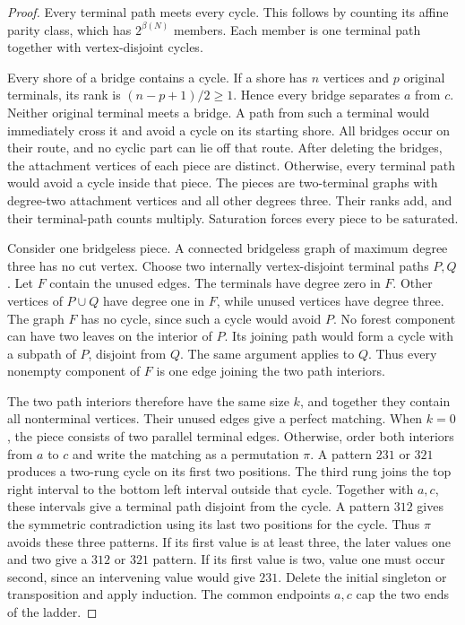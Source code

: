 \begin{proof}
Every terminal path meets every cycle.
This follows by counting its affine parity class, which has $2^{\beta(N)}$ members.
Each member is one terminal path together with vertex-disjoint cycles.

Every shore of a bridge contains a cycle.
If a shore has $n$ vertices and $p$ original terminals, its rank is $(n-p+1)/2\ge1$.
Hence every bridge separates $a$ from $c$.
Neither original terminal meets a bridge.
A path from such a terminal would immediately cross it and avoid a cycle on its starting shore.
All bridges occur on their route, and no cyclic part can lie off that route.
After deleting the bridges, the attachment vertices of each piece are distinct.
Otherwise, every terminal path would avoid a cycle inside that piece.
The pieces are two-terminal graphs with degree-two attachment vertices and all other degrees three.
Their ranks add, and their terminal-path counts multiply.
Saturation forces every piece to be saturated.

Consider one bridgeless piece.
A connected bridgeless graph of maximum degree three has no cut vertex.
Choose two internally vertex-disjoint terminal paths $P,Q$.
Let $F$ contain the unused edges.
The terminals have degree zero in $F$.
Other vertices of $P\cup Q$ have degree one in $F$, while unused vertices have degree three.
The graph $F$ has no cycle, since such a cycle would avoid $P$.
No forest component can have two leaves on the interior of $P$.
Its joining path would form a cycle with a subpath of $P$, disjoint from $Q$.
The same argument applies to $Q$.
Thus every nonempty component of $F$ is one edge joining the two path interiors.

The two path interiors therefore have the same size $k$, and together they contain all nonterminal vertices.
Their unused edges give a perfect matching.
When $k=0$, the piece consists of two parallel terminal edges.
Otherwise, order both interiors from $a$ to $c$ and write the matching as a permutation $\pi$.
A pattern $231$ or $321$ produces a two-rung cycle on its first two positions.
The third rung joins the top right interval to the bottom left interval outside that cycle.
Together with $a,c$, these intervals give a terminal path disjoint from the cycle.
A pattern $312$ gives the symmetric contradiction using its last two positions for the cycle.
Thus $\pi$ avoids these three patterns.
If its first value is at least three, the later values one and two give a $312$ or $321$ pattern.
If its first value is two, value one must occur second, since an intervening value would give $231$.
Delete the initial singleton or transposition and apply induction.
The common endpoints $a,c$ cap the two ends of the ladder.
\end{proof}

